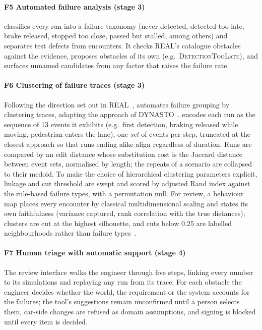 \paragraph*{F5 Automated failure analysis (stage 3)} \tool{} classifies every
run into a failure taxonomy (never detected, detected too late, brake released,
stopped too close, passed but stalled, among others) and separates test defects
from encounters. It checks REAL's catalogue obstacles against the evidence,
proposes obstacles of its own (e.g.\ \textsc{DetectionTooLate}), and surfaces
unnamed candidates from any factor that raises the failure rate.

\paragraph*{F6 Clustering of failure traces (stage 3)} Following the direction
set out in REAL~\cite{real2026}, \tool{} automates failure grouping by
clustering traces, adapting the approach of DYNASTO~\cite{dynasto2026}. \tool{}
encodes each run as the sequence of 13 events it exhibits (e.g.\ first
detection, braking released while moving, pedestrian enters the lane), one
\emph{set} of events per step, truncated at the closest approach so that runs
ending alike align regardless of duration. Runs are compared by an edit
distance whose substitution cost is the Jaccard distance between event sets,
normalised by length; the repeats of a scenario are collapsed to their medoid.
To make the choice of
hierarchical clustering parameters explicit, linkage and cut threshold are
swept and scored by adjusted Rand index against the rule-based
failure types, with a permutation null. For review, a behaviour map places
every encounter by classical multidimensional scaling and states its own
faithfulness (variance captured, rank correlation with the true distances);
clusters are cut at the highest silhouette, and cuts below 0.25 are labelled
neighbourhoods rather than failure types~\cite{kaufman1990}.

\paragraph*{F7 Human triage with automatic support (stage 4)} The review
interface walks the engineer through five steps, linking every number to its
simulations and replaying any run from its trace. For each obstacle the engineer
decides whether the world, the requirement or the system accounts for the
failures; the tool's suggestions remain unconfirmed until a person selects them,
car-side changes are refused as domain assumptions, and signing is blocked until
every item is decided.

